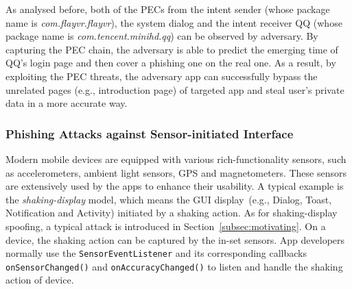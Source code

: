 As analysed before, both of the PECs from the intent sender (whose package name is \textit{com.flayvr.flayvr}), the system dialog and the  intent receiver QQ (whose package name is \textit{com.tencent.minihd.qq}) can be observed by adversary. By capturing the PEC chain, the adversary is able to predict the emerging time of QQ's login page and then cover a phishing one on the real one. As a result, by exploiting the PEC threats, the adversary app can successfully bypass the unrelated pages (e.g., introduction page) of  targeted app and steal user's private data in a more accurate way.




\subsubsection{Phishing Attacks against Sensor-initiated Interface} 

Modern mobile devices are equipped with various rich-functionality sensors, such as accelerometers, ambient light sensors, GPS and magnetometers. 
These sensors are extensively used by the apps to enhance their usability. 
A typical example is the \emph{shaking-display} model, 
which means the GUI display~(e.g., Dialog, Toast, Notification and Activity) 
initiated by a shaking action. 
As for shaking-display spoofing, a typical attack is introduced in Section~\ref{subsec:motivating}. 
On a device, the shaking action can be captured by the in-set sensors. 
App developers normally use the \texttt{SensorEventListener} and its corresponding callbacks \texttt{onSensorChanged()} and \texttt{onAccuracyChanged()} 
to listen and handle the shaking action of device. 



